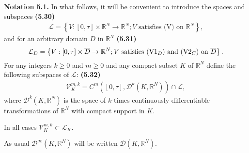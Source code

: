 \documentclass{book}
\numberwithin{equation}{section}
\begin{document}
\begin{enumerate}
    \textbf{Notation 5.1.} In what follows, it will be convenient to introduce the spaces and subspaces \textbf{(5.30)}
    \begin{align*}
        \mathcal{L} = \left\{V:[0,\tau]\times\mathbb{R}^N\to\mathbb{R}^N; V \mbox{ satisfies (V) on } \mathbb{R}^N\right\},
    \end{align*}
    and for an arbitrary domain $D$ in $\mathbb{R}^N$ \textbf{(5.31)}
    \begin{align*}
        \mathcal{L}_D = \left\{V:[0,\tau]\times\overline{D}\to\mathbb{R}^N;V \mbox{ satisfies } ({\rm V1}_D) \mbox{ and } ({\rm V2}_C) \mbox{ on } \overline{D}\right\}.
    \end{align*}
    For any integers $k\ge 0$ and $m\ge 0$ and any compact subset $K$ of $\mathbb{R}^N$ define the following subspaces of $\mathcal{L}$: \textbf{(5.32)}
    \begin{align*}
        \mathcal{V}_K^{m,k} = C^m\left([0,\tau],\mathcal{D}^k(K,\mathbb{R}^N)\right)\cap\mathcal{L},
    \end{align*}
    where $\mathcal{D}^k(K,\mathbb{R}^N)$ is the space of $k$-times continuously differentiable transformations of $\mathbb{R}^N$ with compact support in $K$.
    
    In all cases $\mathcal{V}_K^{m,k}\subset\mathcal{L}_K$.
    
    As usual $\mathcal{D}^\infty(K,\mathbb{R}^N)$ will be written $\mathcal{D}(K,\mathbb{R}^N)$.
\end{enumerate}
\end{document}
